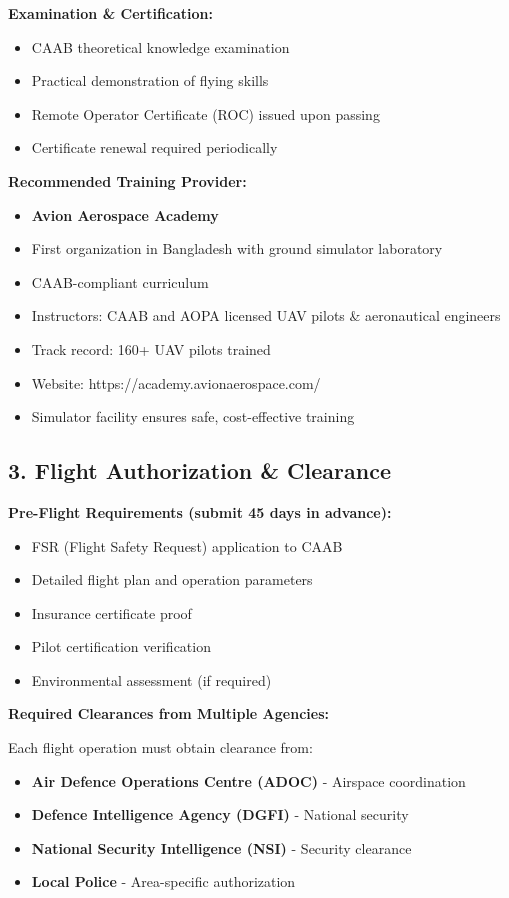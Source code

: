 \textbf{Examination \& Certification:}
\begin{itemize}
    \item CAAB theoretical knowledge examination
    \item Practical demonstration of flying skills
    \item Remote Operator Certificate (ROC) issued upon passing
    \item Certificate renewal required periodically
\end{itemize}

\textbf{Recommended Training Provider:}
\begin{itemize}
    \item \textbf{Avion Aerospace Academy}
    \item First organization in Bangladesh with ground simulator laboratory
    \item CAAB-compliant curriculum
    \item Instructors: CAAB and AOPA licensed UAV pilots \& aeronautical engineers
    \item Track record: 160+ UAV pilots trained
    \item Website: https://academy.avionaerospace.com/
    \item Simulator facility ensures safe, cost-effective training
\end{itemize}

\subsection{3. Flight Authorization \& Clearance}

\textbf{Pre-Flight Requirements (submit 45 days in advance):}

\begin{itemize}
    \item FSR (Flight Safety Request) application to CAAB
    \item Detailed flight plan and operation parameters
    \item Insurance certificate proof
    \item Pilot certification verification
    \item Environmental assessment (if required)
\end{itemize}

\textbf{Required Clearances from Multiple Agencies:}

Each flight operation must obtain clearance from:
\begin{itemize}
    \item \textbf{Air Defence Operations Centre (ADOC)} - Airspace coordination
    \item \textbf{Defence Intelligence Agency (DGFI)} - National security
    \item \textbf{National Security Intelligence (NSI)} - Security clearance
    \item \textbf{Local Police} - Area-specific authorization
\end{itemize}

